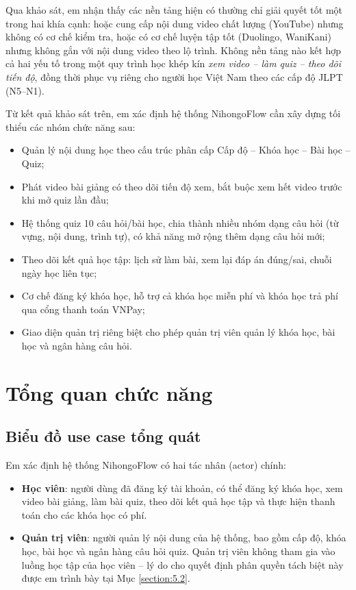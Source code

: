 \documentclass[../DoAn.tex]{subfiles}
\begin{document}
Qua khảo sát, em nhận thấy các nền tảng hiện có thường chỉ giải quyết tốt một trong hai khía cạnh: hoặc cung cấp nội dung video chất lượng (YouTube) nhưng không có cơ chế kiểm tra, hoặc có cơ chế luyện tập tốt (Duolingo, WaniKani) nhưng không gắn với nội dung video theo lộ trình. Không nền tảng nào kết hợp cả hai yếu tố trong một quy trình học khép kín \textit{xem video -- làm quiz -- theo dõi tiến độ}, đồng thời phục vụ riêng cho người học Việt Nam theo các cấp độ JLPT (N5--N1).

Từ kết quả khảo sát trên, em xác định hệ thống NihongoFlow cần xây dựng tối thiểu các nhóm chức năng sau:
\begin{itemize}
    \item Quản lý nội dung học theo cấu trúc phân cấp Cấp độ -- Khóa học -- Bài học -- Quiz;
    \item Phát video bài giảng có theo dõi tiến độ xem, bắt buộc xem hết video trước khi mở quiz lần đầu;
    \item Hệ thống quiz 10 câu hỏi/bài học, chia thành nhiều nhóm dạng câu hỏi (từ vựng, nội dung, trình tự), có khả năng mở rộng thêm dạng câu hỏi mới;
    \item Theo dõi kết quả học tập: lịch sử làm bài, xem lại đáp án đúng/sai, chuỗi ngày học liên tục;
    \item Cơ chế đăng ký khóa học, hỗ trợ cả khóa học miễn phí và khóa học trả phí qua cổng thanh toán VNPay;
    \item Giao diện quản trị riêng biệt cho phép quản trị viên quản lý khóa học, bài học và ngân hàng câu hỏi.
\end{itemize}

\section{Tổng quan chức năng}
\label{section:2.2}

\subsection{Biểu đồ use case tổng quát}
\label{subsection:2.2.1}

Em xác định hệ thống NihongoFlow có hai tác nhân (actor) chính:

\begin{itemize}
    \item \textbf{Học viên}: người dùng đã đăng ký tài khoản, có thể đăng ký khóa học, xem video bài giảng, làm bài quiz, theo dõi kết quả học tập và thực hiện thanh toán cho các khóa học có phí.
    \item \textbf{Quản trị viên}: người quản lý nội dung của hệ thống, bao gồm cấp độ, khóa học, bài học và ngân hàng câu hỏi quiz. Quản trị viên không tham gia vào luồng học tập của học viên -- lý do cho quyết định phân quyền tách biệt này được em trình bày tại Mục \ref{section:5.2}.
\end{itemize}
\end{document}
